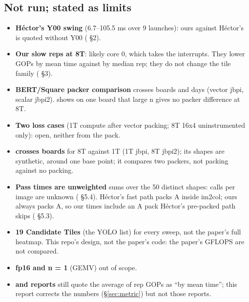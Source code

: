 \subsection*{Not run; stated as limits}
\begin{itemize}\setlength\itemsep{1pt}
\item \textbf{H\'ector's Y00 swing} (6.7--105.5 ms over 9 launches): ours against H\'ector's is quoted without Y00 ( \S2).
\item \textbf{Our slow reps at 8T}: likely core 0, which takes the interrupts. They lower GOPs by mean time against by median rep; they do not change the tile family ( \S3).
\item \textbf{BERT/Square packer comparison} crosses boards and days (vector jbpi, scalar jbpi2).  shows on one board that large n gives no packer difference at 8T.
\item \textbf{Two  loss cases} (1T compute after vector packing; 8T 16x4 uninstrumented only): open, neither from the pack.
\item \textbf{ crosses boards} for 8T against 1T (1T jbpi, 8T jbpi2); its shapes are synthetic, around one base point; it compares two packers, not packing against no packing.
\item \textbf{Pass times are unweighted} sums over the 50 distinct shapes: calls per image are unknown ( \S5.4). H\'ector's fast path packs A inside im2col; ours always packs A, so our times include an A pack H\'ector's pre-packed path skips ( \S5.3).
\item \textbf{19 Candidate Tiles} (the YOLO list) for every sweep, not the paper's full heatmap. This repo's design, not the paper's code: the paper's GFLOPS are not compared.
\item \textbf{fp16 and n = 1} (GEMV) out of scope.
\item \textbf{ and  reports} still quote the average of rep GOPs as ``by mean time''; this report corrects the numbers (\S\ref{sec:metric}) but not those reports.
\end{itemize}
